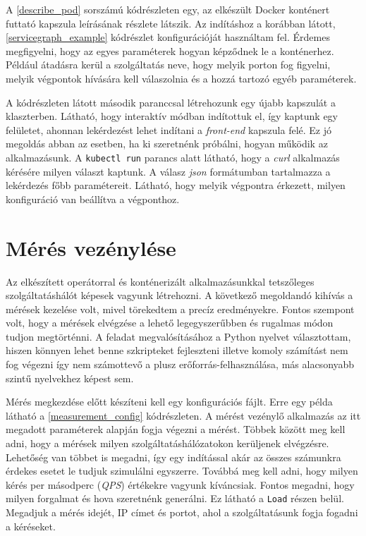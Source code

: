 A \ref{describe_pod} sorszámú kódrészleten egy, az elkészült Docker konténert futtató kapszula leírásának részlete látszik. Az indításhoz a korábban látott, \ref{servicegraph_example} kódrészlet konfigurációját használtam fel. Érdemes megfigyelni, hogy az egyes  paraméterek hogyan képződnek le a konténerhez. Például átadásra kerül a szolgáltatás neve, hogy melyik porton fog figyelni, melyik végpontok hívására kell válaszolnia és a hozzá tartozó egyéb paraméterek.

A kódrészleten látott második paranccsal létrehozunk egy újabb kapszulát a klaszterben. Látható, hogy interaktív módban indítottuk el, így kaptunk egy felületet, ahonnan lekérdezést lehet indítani a \textit{front-end} kapszula felé. Ez jó megoldás abban az esetben, ha ki szeretnénk próbálni, hogyan működik az alkalmazásunk. A \verb+kubectl run+ parancs alatt látható, hogy a \textit{curl} alkalmazás kérésére milyen választ kaptunk. A válasz \textit{json} formátumban tartalmazza a lekérdezés főbb paramétereit. Látható, hogy melyik végpontra érkezett, milyen konfiguráció van beállítva a végponthoz.



\section{Mérés vezénylése}
\label{sec:measure_orchestrate}
Az elkészített operátorral és konténerizált alkalmazásunkkal tetszőleges szolgáltatáshálót képesek vagyunk létrehozni.
A következő megoldandó kihívás a mérések kezelése volt, mivel törekedtem a precíz eredményekre. 
Fontos szempont volt, hogy a mérések elvégzése a lehető legegyszerűbben és rugalmas módon tudjon megtörténni. 
A feladat megvalósításához a Python nyelvet választottam, hiszen könnyen lehet benne szkripteket fejleszteni illetve komoly számítást nem fog végezni így nem számottevő a plusz erőforrás-felhasználása, más alacsonyabb szintű nyelvekhez képest sem. 

Mérés megkezdése előtt készíteni kell egy konfigurációs fájlt. Erre egy példa látható a \ref{measurement_config} kódrészleten. A mérést vezénylő alkalmazás az itt megadott paraméterek alapján fogja végezni a mérést. Többek között meg kell adni, hogy a mérések milyen szolgáltatáshálózatokon kerüljenek elvégzésre. Lehetőség van többet is megadni, így egy indítással akár az összes számunkra érdekes esetet le tudjuk szimulálni egyszerre. Továbbá meg kell adni, hogy milyen kérés per másodperc (\textit{QPS}) értékekre vagyunk kíváncsiak. Fontos megadni, hogy milyen forgalmat és hova szeretnénk generálni. Ez látható a \verb+Load+ részen belül. Megadjuk a mérés idejét, IP címet és portot, ahol a szolgáltatásunk fogja fogadni a kéréseket.\\


